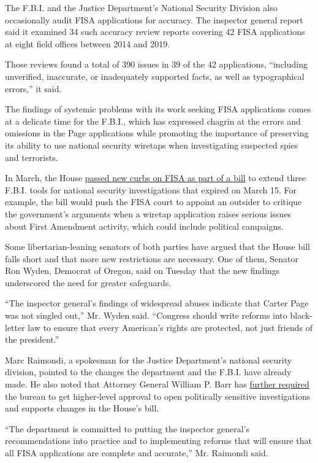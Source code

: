 The F.B.I. and the Justice Department's National Security Division also
occasionally audit FISA applications for accuracy. The inspector general
report said it examined 34 such accuracy review reports covering 42 FISA
applications at eight field offices between 2014 and 2019.

Those reviews found a total of 390 issues in 39 of the 42 applications,
``including unverified, inaccurate, or inadequately supported facts, as
well as typographical errors,'' it said.

The findings of systemic problems with its work seeking FISA
applications comes at a delicate time for the F.B.I., which has
expressed chagrin at the errors and omissions in the Page applications
while promoting the importance of preserving its ability to use national
security wiretaps when investigating suspected spies and terrorists.

In March, the House
\href{https://www.nytimes3xbfgragh.onion/2020/03/11/us/politics/house-passes-fbi-surveillance-bill.html}{passed
new curbs on FISA as part of a bill} to extend three F.B.I. tools for
national security investigations that expired on March 15. For example,
the bill would push the FISA court to appoint an outsider to critique
the government's arguments when a wiretap application raises serious
issues about First Amendment activity, which could include political
campaigns.

Some libertarian-leaning senators of both parties have argued that the
House bill falls short and that more new restrictions are necessary. One
of them, Senator Ron Wyden, Democrat of Oregon, said on Tuesday that the
new findings underscored the need for greater safeguards.

``The inspector general's findings of widespread abuses indicate that
Carter Page was not singled out,'' Mr. Wyden said. ``Congress should
write reforms into black-letter law to ensure that every American's
rights are protected, not just friends of the president.''

Marc Raimondi, a spokesman for the Justice Department's national
security division, pointed to the changes the department and the F.B.I.
have already made. He also noted that Attorney General William P. Barr
has
\href{https://www.nytimes3xbfgragh.onion/2020/02/05/us/politics/barr-2020-investigations.html}{further
required} the bureau to get higher-level approval to open politically
sensitive investigations and supports changes in the House's bill.

``The department is committed to putting the inspector general's
recommendations into practice and to implementing reforms that will
ensure that all FISA applications are complete and accurate,'' Mr.
Raimondi said.


